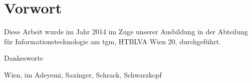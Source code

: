 

\chapter*{Vorwort}

Diese Arbeit wurde im Jahr 2014 im Zuge unserer Ausbildung in der Abteilung für Informationstechnologie am \gls{tgm}, HTBLVA Wien 20, durchgeführt. 


\bigskip

Dankesworte

\bigskip
\bigskip
\bigskip
\bigskip



Wien, im \monthdis \hfill Adeyemi, Saxinger, Schrack, Schwarzkopf \vfill
